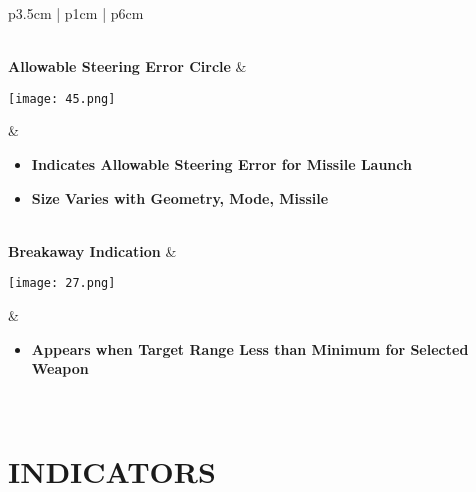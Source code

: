 \documentclass[fontSpartan]{TechCheck}
\begin{document}
\begin{center}
\begin{longtable}{p{3.5cm} | p{1cm} |  p{6cm}}
\begin{minipage}[t]{\linewidth}
\begin{itemize}
\begin{itemize}
					\end{itemize}
				\end{itemize}
			\end{minipage} \\
			\midrule
			\textbf{Allowable Steering Error Circle} &
			\begin{minipage}[t]{\linewidth}
				\vspace{-7pt}
				\centering
				\texttt{[image: 45.png]}
			\end{minipage} &
			\begin{minipage}[t]{\linewidth}
				\vspace{-7pt}
				\begin{itemize}
					\item \textbf{Indicates Allowable Steering Error for Missile Launch}
					\item \textbf{Size Varies with Geometry, Mode, Missile}
				\end{itemize}
			\end{minipage} \\
			\midrule
			\textbf{Breakaway Indication} &
			\begin{minipage}[t]{\linewidth}
				\vspace{-7pt}
				\centering
				\texttt{[image: 27.png]}
			\end{minipage} &
			\begin{minipage}[t]{\linewidth}
				\vspace{-7pt}
				\begin{itemize}
					\item \textbf{Appears when Target Range Less than Minimum for Selected Weapon}
				\end{itemize}
			\end{minipage} \\
			\bottomrule
		\end{longtable}
	\end{center}

	\clearpage

	\section{INDICATORS}
\end{document}
